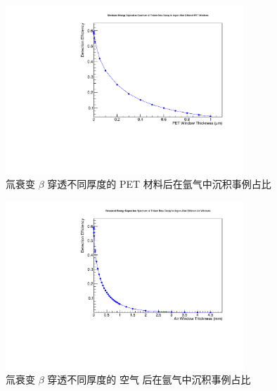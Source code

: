 \begin{figure}[htbp]
	\centering
	\includegraphics[width=0.8\textwidth]{figures/PETThickness.pdf}
	\caption{氚衰变 $\beta$ 穿透不同厚度的 PET 材料后在氩气中沉积事例占比}
	\label{fig:PETThickness}
\end{figure}

\begin{figure}[htbp]
	\centering
	\includegraphics[width=0.8\textwidth]{figures/AirNEdep.pdf}
	\caption{氚衰变 $\beta$ 穿透不同厚度的 空气 后在氩气中沉积事例占比}
	\label{fig:AirThickness}
\end{figure}
